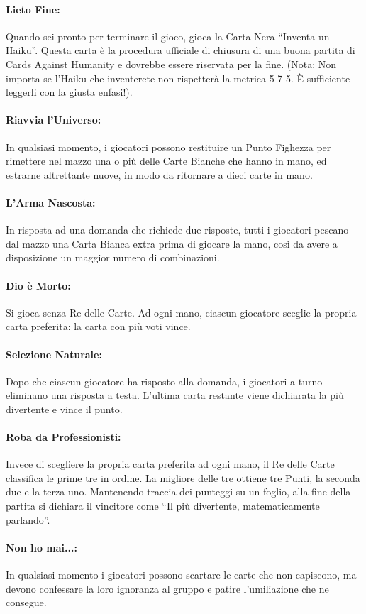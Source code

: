 \documentclass[a4paper,12pt]{article}
\begin{document}
\paragraph{Lieto Fine:} Quando sei pronto per terminare il gioco, gioca la Carta Nera ``Inventa un Haiku''.
Questa carta è la procedura ufficiale di chiusura di una buona partita di Cards Against Humanity
e dovrebbe essere riservata per la fine. (Nota: Non importa se l'Haiku che inventerete non rispetterà la metrica 5-7-5. È sufficiente leggerli con la giusta enfasi!).
\paragraph{Riavvia l'Universo:} In qualsiasi momento, i giocatori possono restituire un Punto Fighezza per rimettere nel mazzo una o più delle Carte Bianche che hanno in mano, ed estrarne altrettante nuove, in modo da ritornare a dieci carte in mano.
\paragraph{L'Arma Nascosta:} In risposta ad una domanda che richiede due risposte, tutti i giocatori pescano
dal mazzo una Carta Bianca extra prima di giocare la mano, così da avere a disposizione un maggior numero di combinazioni.
\paragraph{Dio è Morto:} Si gioca senza Re delle Carte. Ad ogni mano, ciascun giocatore sceglie la propria carta preferita: la carta con più voti vince.
\paragraph{Selezione Naturale:} Dopo che ciascun giocatore ha risposto alla domanda, i giocatori a
turno eliminano una risposta a testa. L'ultima carta restante viene dichiarata la più divertente e
vince il punto.
\paragraph{Roba da Professionisti:} Invece di scegliere la propria carta preferita ad ogni mano, il Re
delle Carte classifica le prime tre in ordine. La migliore delle tre ottiene tre Punti, la seconda due
e la terza uno. Mantenendo traccia dei punteggi su un foglio, alla fine della partita si dichiara il
vincitore come ``Il più divertente, matematicamente parlando''.
\paragraph{Non ho mai...:} In qualsiasi momento i giocatori possono scartare le carte che non capiscono,
ma devono confessare la loro ignoranza al gruppo e patire l'umiliazione che ne consegue.
\end{document}
